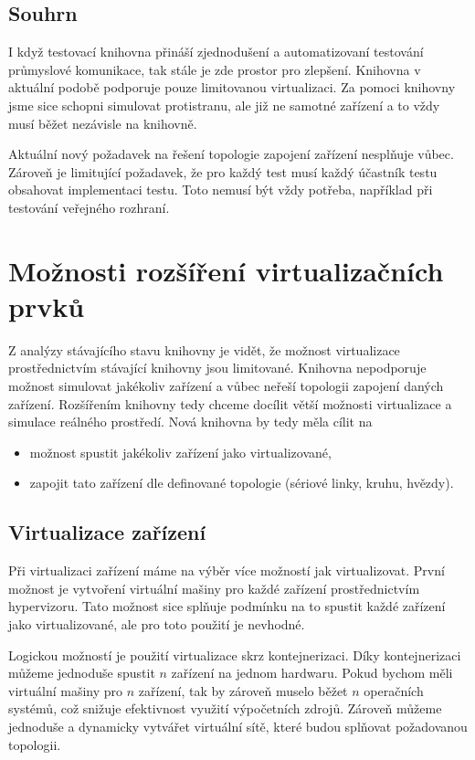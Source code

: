 \subsection{Souhrn}

I když testovací knihovna přináší zjednodušení a automatizovaní testování průmyslové komunikace, tak stále je zde prostor pro zlepšení. Knihovna v aktuální podobě podporuje pouze limitovanou virtualizaci. Za pomoci knihovny jsme sice schopni simulovat protistranu, ale již ne samotné zařízení a to vždy musí běžet nezávisle na knihovně. 

Aktuální nový požadavek na řešení topologie zapojení zařízení nesplňuje vůbec. Zároveň je limitující požadavek, že pro každý test musí každý účastník testu obsahovat implementaci testu. Toto nemusí být vždy potřeba, například při testování veřejného rozhraní.

\section{Možnosti rozšíření virtualizačních prvků}

Z analýzy stávajícího stavu knihovny je vidět, že možnost virtualizace prostřednictvím stávající knihovny jsou limitované. Knihovna nepodporuje možnost simulovat jakékoliv zařízení a vůbec neřeší topologii zapojení daných zařízení. Rozšířením knihovny tedy chceme docílit větší možnosti virtualizace a simulace reálného prostředí. Nová knihovna by tedy měla cílit na

\begin{itemize}
    \item možnost spustit jakékoliv zařízení jako virtualizované,
    \item zapojit tato zařízení dle definované topologie (sériové linky, kruhu, hvězdy).
\end{itemize}


\subsection{Virtualizace zařízení}

Při virtualizaci zařízení máme na výběr více možností jak virtualizovat. První možnost je vytvoření virtuální mašiny pro každé zařízení prostřednictvím hypervizoru. Tato možnost sice splňuje podmínku na to spustit každé zařízení jako virtualizované, ale pro toto použití je nevhodné. 

Logickou možností je použití virtualizace skrz kontejnerizaci. Díky kontejnerizaci můžeme jednoduše spustit $n$ zařízení na jednom hardwaru. Pokud bychom měli virtuální mašiny pro $n$ zařízení, tak by zároveň muselo běžet $n$ operačních systémů, což snižuje efektivnost využití výpočetních zdrojů. Zároveň můžeme jednoduše a dynamicky vytvářet virtuální sítě, které budou splňovat požadovanou topologii. 

